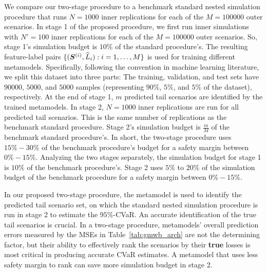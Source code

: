 We compare our two-stage procedure to a benchmark standard nested simulation procedure that runs $N=\num{1000}$ inner replications for each of the $M=\num{100000}$ outer scenarios.
In stage 1 of the proposed procedure, we first run inner simulations with $N'=100$ inner replications for each of the $M=\num{100000}$ outer scenarios.
So, stage 1's simulation budget is $10\%$ of the standard procedure's.
The resulting feature-label pairs $\{(\bm{S}^{(i)}, \widehat{L}_i): i=1,\ldots,M\}$ is used for training different  metamodels.
Specifically, following the convention in machine learning literature, we split this dataset into three parts: The training, validation, and test sets have $\num{90000}$, $\num{5000}$, and $\num{5000}$ samples (representing $90\%$, $5\%$, and $5\%$ of the dataset), respectively.
At the end of stage 1, $m$ predicted tail scenarios are identified by the trained metamodels.
In stage 2, $N=\num{1000}$ inner replications are run for all predicted tail scenarios.
This is the same number of replications as the benchmark standard procedure.
Stage 2's simulation budget is $\frac{m}{M}$ of the benchmark standard procedure's.
In short, the two-stage procedure uses $15\% - 30\%$ of the benchmark procedure's budget for a safety margin between $0\% - 15\%$.
Analyzing the two stages separately, the simulation budget for stage 1 is $10\%$ of the benchmark procedure's.
Stage 2 uses $5\%$ to $20\%$ of the simulation budget of the benchmark procedure for a safety margin between $0\% - 15\%$.

In our proposed two-stage procedure, the metamodel is used to identify the predicted tail scenario set, on which the standard nested simulation procedure is run in stage 2 to estimate the $95\%$-CVaR.
An accurate identification of the true tail scenarios is crucial.
In a two-stage procedure, metamodels' overall prediction errors measured by the MSEs in Table~\ref{tab:gmwb_arch} are not the determining factor, but their ability to effectively rank the scenarios by their \textbf{true} losses is most critical in producing accurate CVaR estimates. 
A metamodel that uses less safety margin to rank can save more simulation budget in stage 2.

